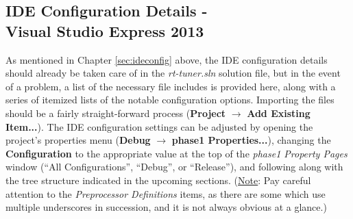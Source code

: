 \documentclass[12pt]{report}
\newcommand{\chapterheaders}{
	\fancyhead[R]{
		\ifnum\value{chapter}>0 \thechapter. \fi
		\MakeUppercase{\leftmark}
	}
}
\newcommand{\appendixpagenumbering}{
	\break
	\pagenumbering{arabic}
	\renewcommand{\thepage}{\thechapter-\arabic{page}}
}
\newcommand{\appendixfigurenumbering}{
		\renewcommand{\thefigure}{\thechapter-\arabic{figure}}
		\renewcommand{\thetable}{\thechapter-\arabic{table}}
		\setcounter{figure}{0}
		\setcounter{table}{0}
}
\begin{document}
\chapterheaders

\begin{appendices}
	\appendixpage
	\appendixpagenumbering
	\appendixfigurenumbering
	
	\chapter[IDE Configuration Details - VS Express 2013]{IDE Configuration Details - \\Visual Studio Express 2013}
	\label{app:ide}
	\setcounter{figure}{0}
	\setcounter{table}{0}

	\indent As mentioned in Chapter \ref{sec:ideconfig} above, the IDE configuration details should already be taken care of in the \emph{rt-tuner.sln} solution file, but in the event of a problem, a list of the necessary file includes is provided here, along with a series of itemized lists of the notable configuration options. Importing the files should be a fairly straight-forward process ({\bf Project} $\rightarrow$ {\bf Add Existing Item...}). The IDE configuration settings can be adjusted by opening the project's properties menu ({\bf Debug} $\rightarrow$ {\bf phase1 Properties...}), changing the {\bf Configuration} to the appropriate value at the top of the \emph{phase1 Property Pages} window (``All Configurations'', ``Debug'', or ``Release''), and following along with the tree structure indicated in the upcoming sections. (\underline{Note}: Pay careful attention to the \emph{Preprocessor Definitions} items, as there are some which use multiple underscores in succession, and it is not always obvious at a glance.)


\end{appendices}
\end{document}

